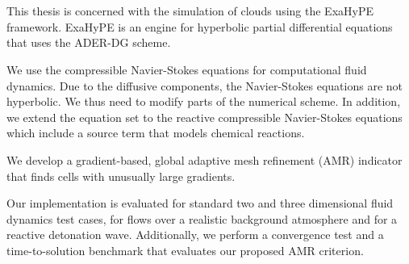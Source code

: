 \chapter{\abstractname}
This thesis is concerned with the simulation of clouds using the ExaHyPE framework.
ExaHyPE is an engine for hyperbolic partial differential equations that uses the ADER-DG scheme.

We use the compressible Navier-Stokes equations for computational fluid dynamics.
Due to the diffusive components, the Navier-Stokes equations are not hyperbolic.
We thus need to modify parts of the numerical scheme.
In addition, we extend the equation set to the reactive compressible Navier-Stokes equations which include a source term that models chemical reactions.

We develop a gradient-based, global adaptive mesh refinement (AMR) indicator that finds cells with unusually large gradients.

Our implementation is evaluated for standard two and three dimensional fluid dynamics test cases, for flows over a realistic background atmosphere and for a reactive detonation wave.
Additionally, we perform a convergence test and a time-to-solution benchmark that evaluates our proposed AMR criterion.

